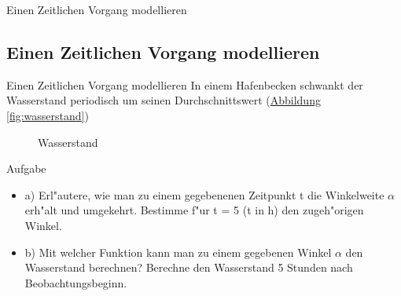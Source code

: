 \documentclass{standalone}
\begin{document}
\begin{frame}
  \begin{center}
    Einen Zeitlichen Vorgang modellieren
  \end{center}
  \subsection{Einen Zeitlichen Vorgang modellieren}
\end{frame}

\begin{frame}{Einen Zeitlichen Vorgang modellieren}
  \noindent In einem Hafenbecken schwankt der Wasserstand periodisch um seinen Durchschnittswert (\hyperref[fig:wasserstand]{Abbildung \autoref{fig:wasserstand}})

  \begin{figure}[hb!]
    \center
    \def\svgwidth{300px}
    
    \caption{Wasserstand}
    \label{fig:wasserstand}
  \end{figure}
\end{frame}


\begin{frame}{Aufgabe}
  \begin{itemize}
    \item<2-> a) Erl{"a}utere, wie man zu einem gegebenenen Zeitpunkt t die Winkelweite $\alpha$ erh{"a}lt und umgekehrt. Bestimme f{"u}r t = 5 (t in h) den zugeh{"o}rigen Winkel.
    \item<3-> b) Mit welcher Funktion kann man zu einem gegebenen Winkel $\alpha$ den Wasserstand berechnen? Berechne den Wasserstand 5 Stunden nach Beobachtungsbeginn.
  \end{itemize}
\end{frame}
\end{document}
